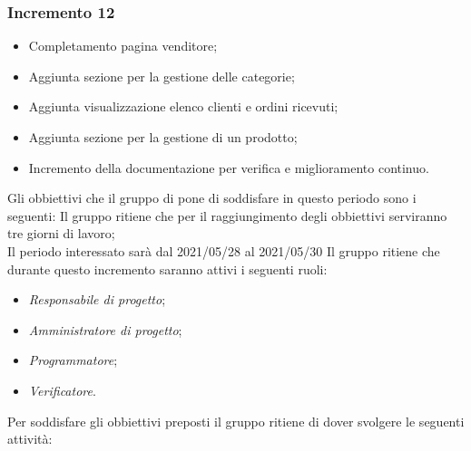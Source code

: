 \subsubsection{Incremento 12}
\begin{itemize}
    \item Completamento pagina venditore;
    \item Aggiunta sezione per la gestione delle categorie;
    \item Aggiunta visualizzazione elenco clienti e ordini ricevuti;
    \item Aggiunta sezione per la gestione di un prodotto;
    \item Incremento della documentazione per verifica e miglioramento continuo.
\end{itemize}
Gli obbiettivi che il gruppo di pone di soddisfare in questo periodo sono i seguenti:
Il gruppo ritiene che per il raggiungimento degli obbiettivi serviranno tre giorni di lavoro;\\
Il periodo interessato sarà dal 2021/05/28 al 2021/05/30
Il gruppo ritiene che durante questo incremento saranno attivi i seguenti ruoli:
\begin{itemize}
    \item \textit{Responsabile di progetto};
    \item \textit{Amministratore di progetto};
    \item \textit{Programmatore};
    \item \textit{Verificatore}.
\end{itemize}
Per soddisfare gli obbiettivi preposti il gruppo ritiene di dover svolgere le seguenti attività:
